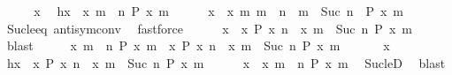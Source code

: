 \begin{isabellebody}
%
\isadelimproof
%
\endisadelimproof
%
\isatagproof
{}\isamarkupfalse%
\isanewline
\ \ \isacommand{{\isacharbraceleft}}\isamarkupfalse%
\ \isamarkupfalse%
\ x\ \isamarkupfalse%
\ h{\isacharcolon}{\isacartoucheopen}x\ {\isasymin}\ {\isacharbraceleft}x{\isachardot}\ {\isasymexists}m\ {\isasymge}\ n{\isachardot}\ P\ x\ m{\isacharbraceright}{\isacartoucheclose}\isanewline
\ \ \ \ \isamarkupfalse%
\ {\isacartoucheopen}x\ {\isasymin}\ {\isacharbraceleft}x{\isachardot}\ {\isasymexists}m{\isachardot}\ {\isacharparenleft}m\ {\isacharequal}\ n\ {\isasymor}\ m\ {\isasymge}\ Suc\ n{\isacharparenright}\ {\isasymand}\ P\ x\ m{\isacharbraceright}{\isacartoucheclose}\isanewline
\ \ \ \ \ \ \isamarkupfalse%
\ Suc{\isacharunderscore}le{\isacharunderscore}eq\ antisym{\isacharunderscore}conv{}\ \isamarkupfalse%
\ fastforce\isanewline
\ \ \ \ \isamarkupfalse%
\ {\isacartoucheopen}x\ {\isasymin}\ {\isacharbraceleft}x{\isachardot}\ P\ x\ n{\isacharbraceright}\ {\isasymunion}\ {\isacharbraceleft}x{\isachardot}\ {\isasymexists}m\ {\isasymge}\ Suc\ n{\isachardot}\ P\ x\ m{\isacharbraceright}{\isacartoucheclose}\ \isamarkupfalse%
\ blast\isanewline
\ \ \isacommand{{\isacharbraceright}}\isamarkupfalse%
\ \isamarkupfalse%
\ {\isacartoucheopen}{\isacharbraceleft}x{\isachardot}\ {\isasymexists}m\ {\isasymge}\ n{\isachardot}\ P\ x\ m{\isacharbraceright}\ {\isasymsubseteq}\ {\isacharbraceleft}x{\isachardot}\ P\ x\ n{\isacharbraceright}\ {\isasymunion}\ {\isacharbraceleft}x{\isachardot}\ {\isasymexists}m\ {\isasymge}\ Suc\ n{\isachardot}\ P\ x\ m{\isacharbraceright}{\isacartoucheclose}\ \isacommand{{\isachardot}{\isachardot}}\isamarkupfalse%
\isanewline
{}\isamarkupfalse%
\isanewline
\ \ \isacommand{{\isacharbraceleft}}\isamarkupfalse%
\ \isamarkupfalse%
\ x\ \ \isamarkupfalse%
\ h{\isacharcolon}{\isacartoucheopen}x\ {\isasymin}\ {\isacharbraceleft}x{\isachardot}\ P\ x\ n{\isacharbraceright}\ {\isasymunion}\ {\isacharbraceleft}x{\isachardot}\ {\isasymexists}m\ {\isasymge}\ Suc\ n{\isachardot}\ P\ x\ m{\isacharbraceright}{\isacartoucheclose}\isanewline
\ \ \ \ \isamarkupfalse%
\ {\isacartoucheopen}x\ {\isasymin}\ {\isacharbraceleft}x{\isachardot}\ {\isasymexists}m\ {\isasymge}\ n{\isachardot}\ P\ x\ m{\isacharbraceright}{\isacartoucheclose}\ \isamarkupfalse%
\ Suc{\isacharunderscore}leD\ \isamarkupfalse%
\ blast\isanewline
\ \ \isacommand{{\isacharbraceright}}\isamarkupfalse%

\end{isabellebody}
